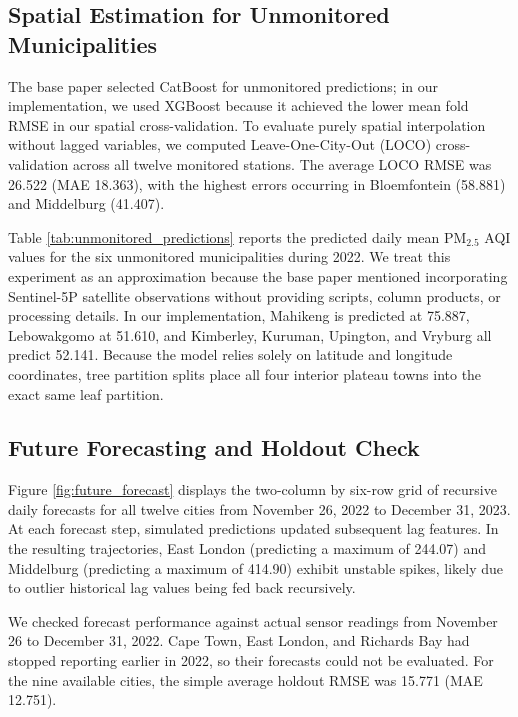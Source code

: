 \subsection{Spatial Estimation for Unmonitored Municipalities}
The base paper selected CatBoost for unmonitored predictions; in our implementation, we used XGBoost because it achieved the lower mean fold RMSE in our spatial cross-validation. To evaluate purely spatial interpolation without lagged variables, we computed Leave-One-City-Out (LOCO) cross-validation across all twelve monitored stations. The average LOCO RMSE was 26.522 (MAE 18.363), with the highest errors occurring in Bloemfontein (58.881) and Middelburg (41.407).

Table \ref{tab:unmonitored_predictions} reports the predicted daily mean $\text{PM}_{2.5}$ AQI values for the six unmonitored municipalities during 2022. We treat this experiment as an approximation because the base paper mentioned incorporating Sentinel-5P satellite observations without providing scripts, column products, or processing details. In our implementation, Mahikeng is predicted at 75.887, Lebowakgomo at 51.610, and Kimberley, Kuruman, Upington, and Vryburg all predict 52.141. Because the model relies solely on latitude and longitude coordinates, tree partition splits place all four interior plateau towns into the exact same leaf partition.

\begin{table}[htbp]
\centering
\small
\caption{Predicted 2022 Annual Mean PM2.5 AQI for Unmonitored Municipalities}
\label{tab:unmonitored_predictions}

\end{table}

\subsection{Future Forecasting and Holdout Check}
Figure \ref{fig:future_forecast} displays the two-column by six-row grid of recursive daily forecasts for all twelve cities from November 26, 2022 to December 31, 2023. At each forecast step, simulated predictions updated subsequent lag features. In the resulting trajectories, East London (predicting a maximum of 244.07) and Middelburg (predicting a maximum of 414.90) exhibit unstable spikes, likely due to outlier historical lag values being fed back recursively.

We checked forecast performance against actual sensor readings from November 26 to December 31, 2022. Cape Town, East London, and Richards Bay had stopped reporting earlier in 2022, so their forecasts could not be evaluated. For the nine available cities, the simple average holdout RMSE was 15.771 (MAE 12.751).

